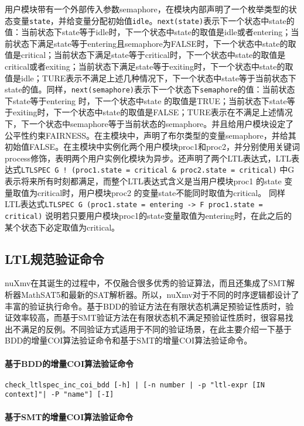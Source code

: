 用户模块带有一个外部传入参数semaphore，在模块内部声明了一个枚举类型的状态变量\verb|state|，并给变量分配初始值\verb|idle|。\verb|next(state)|表示下一个状态中state的值：当前状态下state等于idle时，下一个状态中state的取值是idle或者entering；当前状态下满足state等于entering且semaphore为FALSE时，下一个状态中state的取值是critical；当前状态下满足state等于critical时，下一个状态中state的取值是critical或者exiting；当前状态下满足state等于exiting时，下一个状态中state的取值是idle；TURE表示不满足上述几种情况下，下一个状态中state等于当前状态下state的值。同样，\verb|next(semaphore)|表示下一个状态下\verb|semaphore|的值：当前状态下state等于entering 时，下一个状态中state 的取值是TRUE；当前状态下state等于exiting时，下一个状态中state的取值是FALSE；TURE表示在不满足上述情况下，下一个状态中semaphore等于当前状态的semaphore。并且给用户模块设定了公平性约束FAIRNESS。在主模块中，声明了布尔类型的变量semaphore，并给其初始值FALSE。在主模块中实例化两个用户模块proc1和proc2，并分别使用关键词process修饰，表明两个用户实例化模块为异步。还声明了两个LTL表达式，LTL表达式\verb|LTLSPEC G ! (proc1.state = critical & proc2.state = critical)| 中G表示将来所有时刻都满足，而整个LTL表达式含义是当用户模块proc1 的state 变量取值为critical时，用户模块proc2 的变量state不能同时取值为critical。 同样LTL表达式\verb|LTLSPEC G (proc1.state = entering -> F proc1.state = critical)| 说明若只要用户模块proc1的state变量取值为entering时，在此之后的某个状态下必定取值为critical。

\subsection{LTL规范验证命令}
nuXmv在其诞生的过程中，不仅融合很多优秀的验证算法，而且还集成了SMT解析器MathSAT5和最新的SAT解析器。所以，nuXmv对于不同的时序逻辑都设计了丰富的验证执行命令。基于BDD的验证方法在有限状态机满足预验证性质时，验证效率较高，而基于SMT验证方法在有限状态机不满足预验证性质时，很容易找出不满足的反例。不同验证方式适用于不同的验证场景，在此主要介绍一下基于BDD的增量COI算法验证命令和基于SMT的增量COI算法验证命令。

\paragraph{基于BDD的增量COI算法验证命令}


\begin{lstlisting}
check_ltlspec_inc_coi_bdd [-h] | [-n number | -p "ltl-expr [IN context]"| -P "name"] [-I]
\end{lstlisting}


\paragraph{基于SMT的增量COI算法验证命令}

